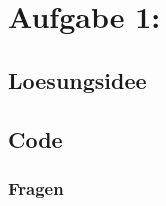 \documentclass{report}
\newcommand{\name}{Marco Söllinger}
\newcommand{\matnr}{s2410306011}
\begin{document}


\section{Aufgabe 1:}

\subsection{Loesungsidee}


\subsection{Code}




\subsubsection{Fragen}
\end{document}
